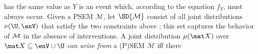 {%
has the same value as $Y$ is an event
which, according to the equation $f_Y$,
must always occur.
}%
Given a 
PSEM
 $\mathcal M$, let $\SD{\mathcal M}$ consist of all 
joint distributions $\nu(\U, \enV)$ that satisfy the two constraints above
%
\unskip; this set
captures the behavior of $\cal M$ in
the absence of interventions.  
A joint distribution $\mu(\mat X)$ over $\mat X \subseteq \enV \cup \U$ \emph{can arise from} a (P)SEM $\mathcal M$ iff there 
